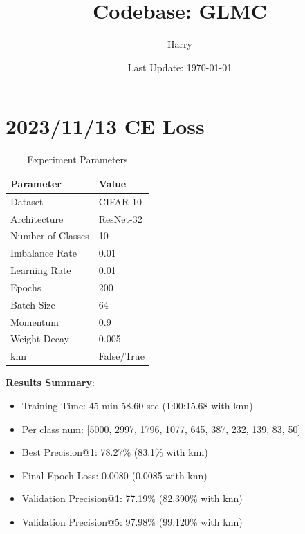 \documentclass{article}
\title{Codebase: GLMC}
\author{Harry}
\date{Last Update: \today}
\begin{document}
\maketitle

\section{2023/11/13 CE Loss}
\begin{table}[h!]
\centering
\caption{Experiment Parameters}
\label{tab:parameters}
\begin{tabular}{ll}
\toprule
Parameter & Value \\
\midrule
Dataset & CIFAR-10 \\
Architecture & ResNet-32 \\
Number of Classes & 10 \\
Imbalance Rate & 0.01 \\
Learning Rate & 0.01 \\
Epochs & 200 \\
Batch Size & 64 \\
Momentum & 0.9 \\
Weight Decay & 0.005 \\
knn & False/True \\
\bottomrule
\end{tabular}
\end{table}

\textbf{Results Summary}:
\begin{itemize}
    \item Training Time: 45 min 58.60 sec (1:00:15.68 with knn)
    \item Per class num: [5000, 2997, 1796, 1077, 645, 387, 232, 139, 83, 50]
    \item Best Precision@1: 78.27\%  (83.1\% with knn)
    \item Final Epoch Loss: 0.0080 (0.0085 with knn)
    \item Validation Precision@1: 77.19\% (82.390\% with knn)
    \item Validation Precision@5: 97.98\% (99.120\% with knn)
\end{itemize}
\end{document}
